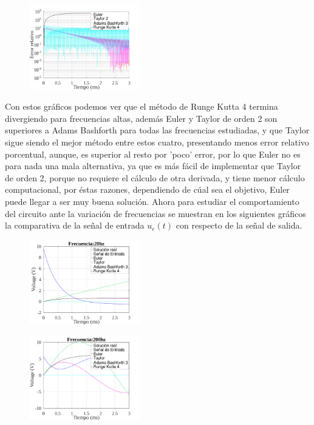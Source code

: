 \documentclass[letterpaper, 10 pt, conference]{ieeeconf}  %
\begin{document}
\begin{figure}[H]
\centering
\includegraphics[width=0.43\textwidth]{../plots/ej5/error-20000hz.png}
\label{fig:fig}
\end{figure}

Con estos gr\'aficos podemos ver que el m\'etodo de Runge Kutta 4 termina divergiendo para frecuencias altas, adem\'as Euler y Taylor de orden 2 son superiores a Adams Bashforth para todas las frecuencias estudiadas, y que Taylor sigue siendo el mejor m\'etodo entre estos cuatro, presentando menos error relativo porcentual, aunque, es superior al resto por 'poco' error, por lo que Euler no es para nada una mala alternativa, ya que es m\'as f\'acil de implementar que Taylor de orden 2, porque no requiere el c\'alculo de otra derivada, y tiene menor c\'alculo computacional, por \'estas razones, dependiendo de c\'ual sea el objetivo, Euler puede llegar a ser muy buena soluci\'on.
Ahora para estudiar el comportamiento del circuito ante la variaci\'on de frecuencias se muestran en los siguientes gr\'aficos la comparativa de la señal de entrada $u_{e}(t)$ con respecto de la señal de salida.

\begin{figure}[H]
\centering
\includegraphics[width=0.43\textwidth]{../plots/ej5/Frecuencia:20hz-ue.png}
\label{fig:fig}
\end{figure}

\begin{figure}[H]
\centering
\includegraphics[width=0.43\textwidth]{../plots/ej5/Frecuencia:200hz-ue.png}
\label{fig:fig}
\end{figure}
\end{document}
